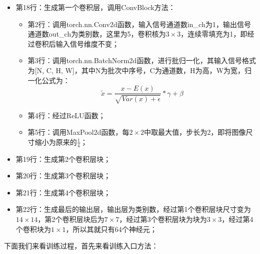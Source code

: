 \begin{itemize}
\item 第18行：生成第一个卷积层，调用ConvBlock方法：
	\begin{itemize}
	\item 第2行：调用torch.nn.Conv2d函数，输入信号通道数in\_ch为1，输出信号通道数out\_ch为类别数，这里为5，卷积核为$3 \times 3$，连续零填充为1，即经过卷积后输入信号维度不变；
	\item 第3行：调用torch.nn.BatchNorm2d函数，进行批归一化，其输入信号格式为[N, C, H, W]，其中N为批次中序号，C为通道数，H为高，W为宽，归一化公式为：
\begin{equation}
\tilde{x} = \frac{x-E(x)}{ \sqrt{ Var(x) + \epsilon } } * \gamma + \beta
\label{e0301-batch-norm-2d-formula}
\end{equation}
	\item 第4行：经过ReLU函数；
	\item 第5行：调用MaxPool2d函数，每$2 \times 2$中取最大值，步长为2，即将图像尺寸缩小为原来的$\frac{1}{4}$；
	\end{itemize}
\item 第19行：生成第2个卷积层块；
\item 第20行：生成第3个卷积层块；
\item 第21行：生成第4个卷积层块；
\item 第22行：生成最后的输出层，输出层为类别数，经过第1个卷积层块尺寸变为$14 \times 14$，第2个卷积层块后为$7 \times 7$，经过第3个卷积层块为块为$3 \times 3$，经过第4个卷积块为$1 \times 1$，所以其就只有64个神经元；
\end{itemize}
下面我们来看训练过程，首先来看训练入口方法：
